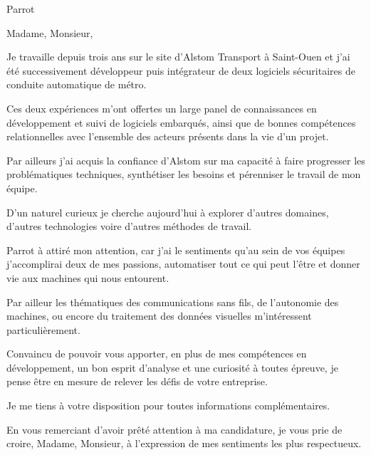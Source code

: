 \documentclass[12pt]{lettre}
\makeatletter
\newcommand*{\NoRule}{\renewcommand*{\rule@length}{0}}
\makeatother
\begin{document}
\begin{letter}{Parrot}

  \def\concname{Objet :~}


  \signature{Hoel IRIS}
  \address{Hoel IRIS\\
  54 avenue Mathurin Moreau\\
  75019 Paris\\
  Tel : 06 18 39 30 11\\
  E-Mail : hoel.iris@gmail.com}
  \NoRule
  \notelephone
  \nofax
    \opening{Madame, Monsieur,}


    Je travaille depuis trois ans sur le site d'Alstom Transport à Saint-Ouen et j'ai été successivement développeur puis intégrateur de deux logiciels sécuritaires de conduite automatique de métro.

    Ces deux expériences m'ont offertes un large panel de connaissances en développement et suivi de logiciels embarqués, ainsi que de bonnes compétences relationnelles avec l'ensemble des acteurs présents dans la vie d'un projet. 

    Par ailleurs j'ai acquis la confiance d'Alstom sur ma capacité à faire progresser les problématiques techniques, synthétiser les besoins et pérenniser le travail de mon équipe.

    D'un naturel curieux je cherche aujourd'hui à explorer d'autres domaines, d'autres technologies voire d'autres méthodes de travail.

    Parrot à attiré mon attention, car j'ai le sentiments qu'au sein de vos équipes j'accomplirai deux de mes passions, automatiser tout ce qui peut l'être et donner vie aux machines qui nous entourent.
    
    Par ailleur les thématiques des communications sans fils, de l'autonomie des machines, ou encore du traitement des données visuelles m'intéressent particulièrement.  

    Convaincu de pouvoir vous apporter, en plus de mes compétences en développement, un bon esprit d'analyse et une curiosité à toutes épreuve, je pense être en mesure de relever les défis de votre entreprise.
        
    Je me tiens à votre disposition pour toutes informations complémentaires.
 
    
    \closing{En vous remerciant d’avoir prêté attention à ma candidature, je vous prie de croire, Madame, Monsieur, à l’expression de mes sentiments les plus respectueux.}
    
 
\end{letter}
 
\end{document}
